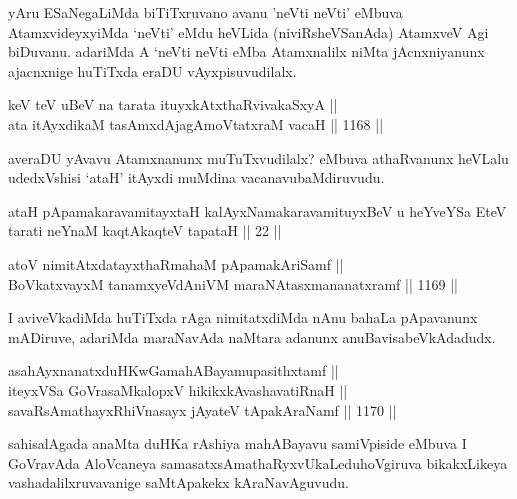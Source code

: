 \begin{artha}
yAru ESaNegaLiMda biTiTxruvano avanu 'neVti neVti' eMbuva AtamxvideyxyiMda `neVti' eMdu heVLida (niviRsheVSanAda) AtamxveV Agi biDuvanu. adariMda A `neVti neVti eMba Atamxnalilx niMta jAcnxniyanunx ajacnxnige huTiTxda eraDU vAyxpisuvudilalx.
\end{artha}

\begin{shl}
keV teV uBeV na tarata ituyxkAtxthaRvivakaSxyA ||  \\
ata itAyxdikaM tasAmxdAjagAmoVtatxraM vacaH \hfill || 1168 ||  
\end{shl}

\begin{artha}
averaDU yAvavu Atamxnanunx muTuTxvudilalx? eMbuva athaRvanunx heVLalu udedxVshisi `ataH' itAyxdi muMdina vacanavu\break baMdiruvudu.
\end{artha}


\begin{shl}
ataH pApamakaravamitayxtaH kalAyxNamakaravamituyxBeV u heYveYSa EteV tarati neYnaM kaqtAkaqteV tapataH || 22 ||
\end{shl}


\begin{shl}
atoV nimitAtxdatayxthaRmahaM pApamakAriSamf || \\
BoVkatxvayxM tanamxyeVdAniVM maraNAtasxmananatxramf \hfill || 1169 ||  
\end{shl}

\begin{artha}
I aviveVkadiMda huTiTxda rAga nimitatxdiMda nAnu bahaLa pApavanunx mADiruve, adariMda maraNavAda naMtara adanunx  anuBavisabeVkAdadudx.
\end{artha}

\begin{shl}
asahAyxnanatxduHKwGamahABayamupasithxtamf || \\
iteyxVSa GoVrasaMkalopxV hikikxkAvashavatiRnaH || \\
savaRsAmathayxRhiVnasayx jAyateV tApakAraNamf \hfill || 1170 ||  
\end{shl}

\begin{artha}
sahisalAgada anaMta duHKa rAshiya mahABayavu samiVpiside eMbuva I GoVravAda  AloVcaneya samasatxsAmathaRyxvU\break kaLeduhoVgiruva bikakxLikeya vashadalilxruvavanige saMtApakekx kAraNavAguvudu.
\end{artha}

